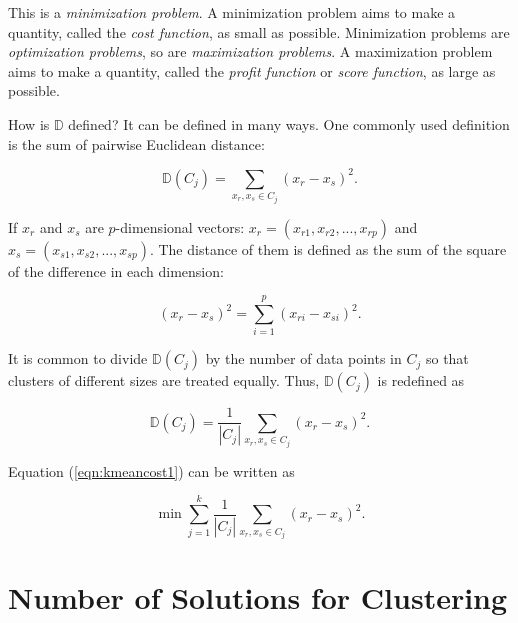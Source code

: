 This is a {\it minimization problem}. A minimization problem aims to
make a quantity, called the {\it cost function}, as small as possible.
Minimization problems are {\it optimization problems}, so are {\it
  maximization problems}.  A maximization problem aims to make a
quantity, called the {\it profit function} or {\it score function}, as
large as possible.


How is $\mathds{D}$ defined?  It can be defined in many ways. One commonly
used definition is the sum of pairwise Euclidean distance:


\begin{equation}
\mathds{D}(C_j) = \underset{x_r, x_s \in C_j}{\sum} (x_r - x_s)^ 2.
\end{equation}

If $x_r$ and $x_s$ are $p$-dimensional vectors:
$x_r = (x_{r1}, x_{r2}, ..., x_{rp})$ and
$x_s = (x_{s1}, x_{s2}, ..., x_{sp})$.
The distance of them is defined as the sum of the square
of the difference in each dimension:

\begin{equation}
(x_r - x_s)^ 2 = \underset{i = 1}{\overset{p}{\sum}} (x_{ri} - x_{si})^2.
\end{equation}

It is common to divide $\mathds{D}(C_j)$ by the number of data points
in $C_j$ so that clusters of different sizes
are treated equally. Thus, $\mathds{D}(C_j)$ is redefined as

\begin{equation}
\mathds{D}(C_j) = \frac{1}{|C_j|} \underset{x_r, x_s \in C_j}{\sum} (x_r - x_s)^ 2.
\end{equation}

Equation (\ref{eqn:kmeancost1}) can be written as

\begin{equation}
  \min \underset{j = 1}{\overset{k}{\sum}}  \frac{1}{|C_j|} \underset{x_r, x_s \in C_j}{\sum} (x_r - x_s)^ 2.
  \label{equation:kmean:cost}
\end{equation}


\section{Number of Solutions for Clustering}

